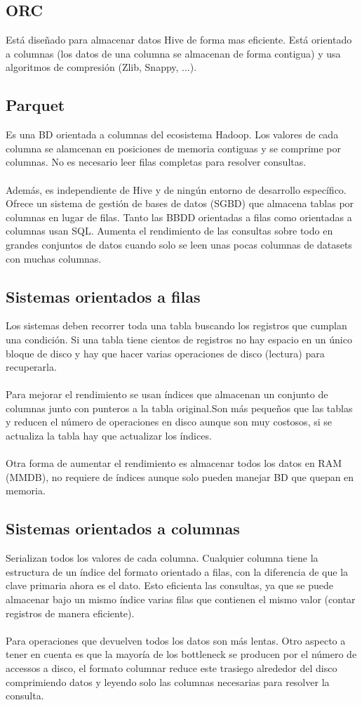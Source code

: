 \subsection{ORC}
Está diseñado para almacenar datos Hive de forma mas eficiente. Está orientado a columnas (los datos de una columna se almacenan de forma contigua) y usa algoritmos de compresión (Zlib, Snappy, ...).
\subsection{Parquet}
Es una BD orientada a columnas del ecosistema Hadoop. Los valores de cada columna se alamcenan en posiciones de memoria contiguas y se comprime por columnas. No es necesario leer filas completas para resolver consultas.\\\\
 Además, es independiente de Hive y de ningún entorno de desarrollo específico. Ofrece un sistema de gestión de bases de datos (SGBD) que almacena tablas por columnas en lugar de filas. Tanto las BBDD orientadas a filas como orientadas a columnas usan SQL. Aumenta el rendimiento de las consultas sobre todo en grandes conjuntos de datos cuando solo se leen unas pocas columnas de datasets con muchas columnas. 
\subsection{Sistemas orientados a filas}
Los sistemas deben recorrer toda una tabla buscando los registros que cumplan una condición. Si una tabla tiene cientos de registros no hay espacio en un único bloque de disco y hay que hacer varias operaciones de disco (lectura) para recuperarla.\\\\
Para mejorar el rendimiento se usan índices que almacenan un conjunto de columnas junto con punteros a la tabla original.Son más pequeños que las tablas y reducen el número de operaciones en disco aunque son muy costosos, si se actualiza la tabla hay que actualizar los índices.\\\\
 Otra forma de aumentar el rendimiento es almacenar todos los datos en RAM (MMDB), no requiere de índices aunque solo pueden manejar BD que quepan en memoria.
\subsection{Sistemas orientados a columnas}
Serializan todos los valores de cada columna. Cualquier columna tiene la estructura de un índice del formato orientado a filas, con la diferencia de que la clave primaria ahora es el dato. Esto eficienta las consultas, ya que se puede almacenar bajo un mismo índice varias filas que contienen el mismo valor (contar registros de manera eficiente).\\\\
Para operaciones que devuelven todos los datos son más lentas. Otro aspecto a tener en cuenta es que la mayoría de los bottleneck se producen por el número de accessos a disco, el formato columnar reduce este trasiego alrededor del disco comprimiendo datos y leyendo solo las columnas necesarias para resolver la consulta. 
